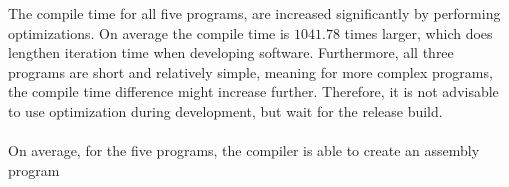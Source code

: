 \begin{table}[H]
    \noindent{}
    \caption{Results from benchmark. Diff is calculated as the difference between no optimizations
    and optimizations enabled.}
    \label{table:benchmark-results}
\end{table}
\noindent
The compile time for all five programs, are increased significantly by performing optimizations.
On average the compile time is $1041.78$ times larger, which does lengthen iteration time
when developing software. Furthermore, all three programs are short and relatively simple,
meaning for more complex programs, the compile time difference might increase further.
Therefore, it is not advisable to use optimization during development, but wait for the
release build.
\\
\\
On average, for the five programs, the \lan compiler is able to create an assembly program
